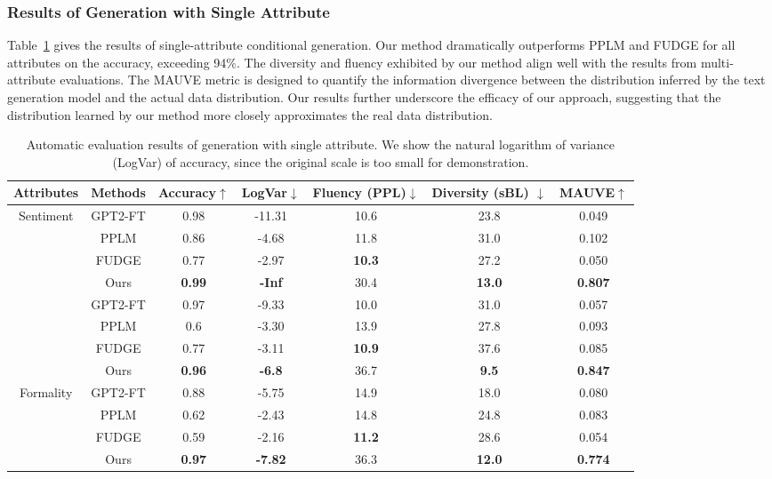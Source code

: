 \documentclass[11pt]{article}
\begin{document}
\subsubsection{Results of Generation with Single Attribute}
\label{app:generation_single}
Table~\ref{tab:single-cg} gives the results of single-attribute conditional generation. Our method dramatically outperforms PPLM and FUDGE for all attributes on the accuracy,  exceeding 94\%. The diversity and fluency exhibited by our method align well with the results from multi-attribute evaluations. The MAUVE metric is designed to quantify the information divergence between the distribution inferred by the text generation model and the actual data distribution. Our results further underscore the efficacy of our approach, suggesting that the distribution learned by our method more closely approximates the real data distribution.
\begin{table}[ht]
\centering
\small
\vspace{-7pt}
\begin{tabular}{ccccccc}
\toprule
Attributes   & Methods & Accuracy$\uparrow$  & LogVar$\downarrow$ & Fluency (PPL)$\downarrow$ &Diversity (sBL) $\downarrow$  & MAUVE$\uparrow$ \\\midrule
\multirow{5}{*}{Sentiment}     &GPT2-FT& 0.98 & -11.31 & 10.6 & 23.8 &0.049 \\\cmidrule{2-7}
& PPLM & 0.86 & -4.68 & 11.8 & 31.0  & 0.102\\ & FUDGE & 0.77 & -2.97 & \textbf{10.3} & 27.2&0.050\\  & Ours &\textbf{0.99} & \textbf{-Inf} & 30.4 & \textbf{13.0} &\textbf{0.807}\\\midrule 

\multirow{5}{*}{Tense}&GPT2-FT& {0.97} & {-9.33} & {10.0} & 31.0&0.057 \\
\cmidrule{2-7} 
& PPLM &0.6 & -3.30 & 13.9 & 27.8  &0.093\\ & FUDGE & 0.77 & -3.11 & \textbf{10.9} & 37.6 &0.085\\ & Ours& \textbf{0.96} & \textbf{-6.8} & 36.7&\textbf{9.5}  &\textbf{0.847}\\\midrule  

\multirow{5}{*}{Formality}   &GPT2-FT& 0.88 & -5.75 & 14.9 & 18.0 &0.080\\\cmidrule{2-7} 
& PPLM &0.62 & -2.43 & 14.8 & 24.8 &0.083  \\ & FUDGE& 0.59 & -2.16 & \textbf{11.2} & 28.6 &0.054 \\  
& Ours& \textbf{0.97} & \textbf{-7.82} & 36.3 & \textbf{12.0} &\textbf{0.774} \\\bottomrule  \end{tabular}
\caption{Automatic evaluation results of generation with single attribute. We show the natural logarithm of variance (LogVar) of accuracy, since the original
scale is too small for demonstration.}
\label{tab:single-cg}
\vspace{-10pt}
\end{table}
\end{document}
